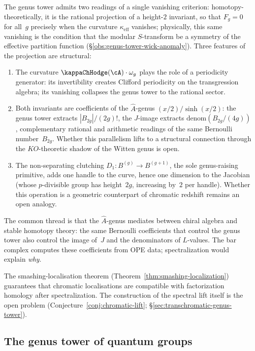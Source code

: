The genus tower admits two readings of a single
vanishing criterion: homotopy-theoretically, it is the
rational projection of a height-$2$ invariant, so that
$F_g = 0$ for all~$g$ precisely when the curvature
$\kappa_{\mathrm{eff}}$ vanishes; physically, this same
vanishing is the condition that the modular $S$-transform
be a symmetry of the effective partition function
(\S\ref{obs:genus-tower-wick-anomaly}).
Three features of the projection are structural:
\begin{enumerate}[label=(\roman*)]
\item The curvature $\kappaChHodge(\cA) \cdot \omega_g$
 plays the role of a periodicity generator:
 its invertibility creates Clifford periodicity on the
 transgression algebra; its vanishing
 collapses the genus tower to the rational sector.
\item Both invariants are coefficients of the
 $\hat{A}$-genus $(x/2)/\sinh(x/2)$: the genus tower
 extracts $|B_{2g}|/(2g)!$, the $J$-image extracts
 $\mathrm{denom}(B_{2g}/(4g))$, complementary
 rational and arithmetic readings of the same
 Bernoulli number~$B_{2g}$. Whether this parallelism
 lifts to a structural connection through the
 $KO$-theoretic shadow of the Witten genus is open.
\item The non-separating clutching
 $D_1 \colon B^{(g)} \to B^{(g+1)}$,
 the sole genus-raising primitive,
 adds one handle to the curve, hence
 one dimension to the Jacobian (whose $p$-divisible
 group has height~$2g$, increasing by~$2$ per handle).
 Whether this operation is a geometric counterpart
 of chromatic redshift remains an open analogy.
\end{enumerate}
The common thread is that the $\hat{A}$-genus mediates between
chiral algebra and stable homotopy theory: the same Bernoulli
coefficients that control the genus tower also control the image
of~$J$ and the denominators of $L$-values. The bar complex
computes these coefficients from OPE data; spectralization would
explain \emph{why}.

The smashing-localisation theorem
(Theorem~\ref{thm:smashing-localization}) guarantees that
chromatic localisations are compatible with factorization
homology after spectralization.
The construction of the spectral lift itself is the open
problem (Conjecture~\ref{conj:chromatic-lift};
\S\ref{sec:transchromatic-genus-tower}).

\subsection{The genus tower of quantum groups}
\label{subsec:genus-tower-quantum-groups}

